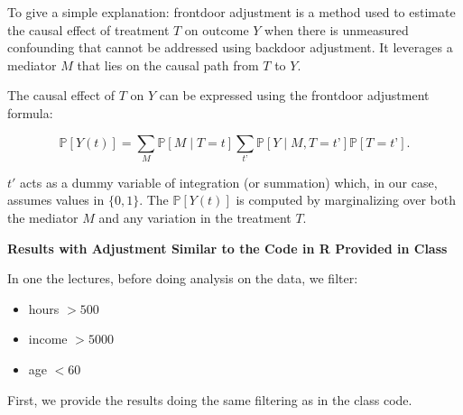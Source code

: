 \documentclass{article}
\begin{document}
To give a simple explanation: frontdoor adjustment is a method used to estimate the causal effect of treatment $T$ on outcome $Y$ when there is unmeasured confounding that cannot be addressed using backdoor adjustment. It leverages a mediator $M$ that lies on the causal path from $T$ to $Y$.

The causal effect of $T$ on $Y$ can be expressed using the frontdoor adjustment formula:

\begin{equation}
\mathbb{P}[Y(t)] = \sum_M \mathbb{P}[M \mid T=t] \sum_{t’} \mathbb{P}[Y \mid M, T=t’] \mathbb{P}[T=t’].
\end{equation}

$t'$ acts as a dummy variable of integration (or summation) which, in our case, assumes values in $\{0, 1\}$. The $\mathbb{P}[Y(t)]$ is computed by marginalizing over both the mediator $M$ and any variation in the treatment $T$.

\textbf{Results with Adjustment Similar to the Code in R Provided in Class}

In one the lectures, before doing analysis on the data, we filter:
\begin{itemize}
  \item hours $> 500$
  \item income $> 5000$
  \item age $< 60$
\end{itemize}

First, we provide the results doing the same filtering as in the class code.
\end{document}
